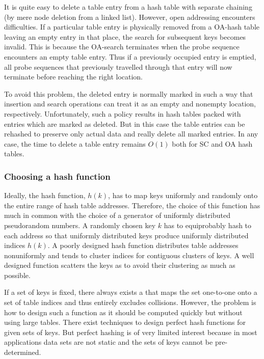It is quite easy to delete a table entry from a hash table with separate 
chaining (by mere node deletion from a linked list). However, open addressing 
encounters difficulties. If a particular table entry is physically removed
from a OA-hash table leaving an empty entry in that place, the search for 
subsequent keys becomes invalid. This is because the OA-search terminates when 
the probe sequence encounters an empty table entry. Thus if a previously occupied 
entry is emptied, all probe sequences that 
previously travelled through that entry will
now terminate before reaching the right location. 

To avoid this problem, the deleted entry is normally marked in such a way that
insertion and search operations can treat it as an empty and 
nonempty location, respectively. Unfortunately, such a policy results in hash 
tables packed with entries which are marked as deleted. But in this case the 
table entries can be rehashed to preserve only actual data and really delete all
marked entries. In any case, the time to delete a table entry remains \(O(1)\) 
both for SC  and OA hash tables.

\subsubsection{Choosing a hash function}
\label{sec:choice:hash:fun} 

Ideally, the hash 
function, \(h(k)\), has to map keys uniformly and randomly onto 
the entire range of hash table addresses. Therefore, the
choice of this function has much in common with the choice of
a generator of uniformly distributed pseudorandom numbers. 
A randomly chosen key \(k\) has to equiprobably hash to each
address so that uniformly distributed keys produce uniformly
distributed indices \(h(k)\). A poorly designed hash function
distributes table addresses nonuniformly and tends to
cluster indices for contiguous clusters of keys. 
A well designed function scatters the keys as to avoid
their clustering as much as possible.

If a set of keys is fixed, there always exists a 
that maps the set one-to-one onto a set of table indices and thus entirely 
excludes collisions. However, the problem is how to design such a function as
it should be computed quickly but without using large tables.
There exist techniques to design perfect hash functions for given sets of keys. 
But perfect hashing is of very limited interest because in most applications 
data sets are not static and the sets of keys cannot be pre-determined.

